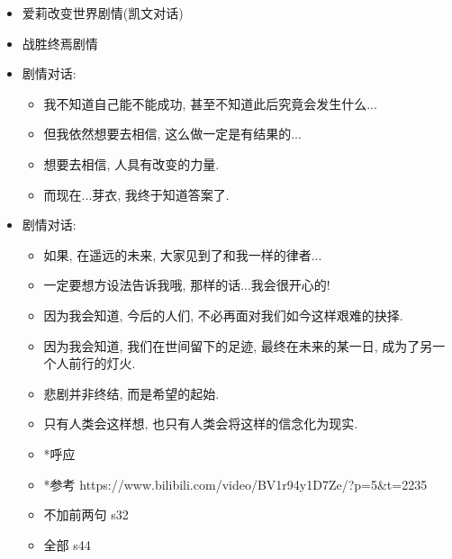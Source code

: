 \documentclass[a4paper]{article}
\begin{document}
\begin{itemize}
    \item 爱莉改变世界剧情(凯文对话)
    \item 战胜终焉剧情
    \item 剧情对话:
    \begin{itemize}
        \item 我不知道自己能不能成功, 甚至不知道此后究竟会发生什么...
        \item 但我依然想要去相信, 这么做一定是有结果的...
        \item 想要去相信, 人具有改变的力量.
        \item 而现在...芽衣, 我终于知道答案了.
    \end{itemize}
    \item 剧情对话:
    \begin{itemize}
        \item 如果, 在遥远的未来, 大家见到了和我一样的律者...
        \item 一定要想方设法告诉我哦, 那样的话...我会很开心的!
        \item 因为我会知道, 今后的人们, 不必再面对我们如今这样艰难的抉择.
        \item 因为我会知道, 我们在世间留下的足迹, 最终在未来的某一日, 成为了另一个人前行的灯火.
        \item 悲剧并非终结, 而是希望的起始.
        \item 只有人类会这样想, 也只有人类会将这样的信念化为现实.
        \item *呼应
        \item *参考 https://www.bilibili.com/video/BV1r94y1D7Ze/?p=5&t=2235
        \item 不加前两句 s32
        \item 全部 s44
    \end{itemize}
\end{itemize}
\end{document}
